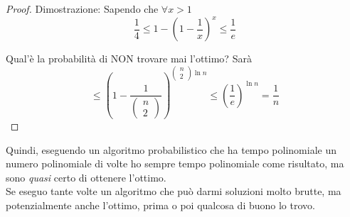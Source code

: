 \begin{proof}
	Dimostrazione: Sapendo che $\forall x >1$
	$$ \frac{1}{4} \leq1 - \left( 1 - \frac{1}{x}\right)^x \leq \frac{1}{e}$$
	
	Qual'è la probabilità di NON trovare mai l'ottimo? Sarà
	$$ \leq \left(1 - \frac{1}{\left(\begin{array}{c} n \\ 2 \end{array}\right)}\right)^{\left(\begin{array}{c} n \\ 2 \end{array}\right) \ln n} 
	\leq \left(\frac{1}{e}\right)^{\ln n} 
	= \frac{1}{n}
	$$
\end{proof}

Quindi, eseguendo un algoritmo probabilistico che ha tempo polinomiale un numero polinomiale di volte ho sempre tempo polinomiale come risultato, ma sono \textit{quasi} certo di ottenere l'ottimo.\\

Se eseguo tante volte un algoritmo che può darmi soluzioni molto brutte, ma potenzialmente anche l'ottimo, prima o poi qualcosa di buono lo trovo.\\


